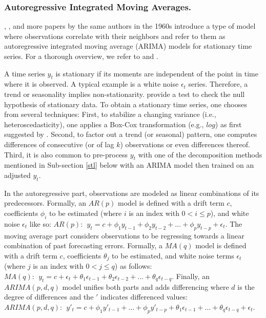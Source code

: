 \subsubsection{Autoregressive Integrated Moving Averages.}
\label{arima}

\cite{box1962}, \cite{box1968}, and more papers by the same authors in the
    1960s introduce a type of model where observations correlate with their
    neighbors and refer to them as autoregressive integrated moving average
    (ARIMA) models for stationary time series.
For a thorough overview, we refer to \cite{box2015} and \cite{brockwell2016}.

A time series $y_t$ is stationary if its moments are independent of the
    point in time where it is observed.
A typical example is a white noise $\epsilon_t$ series.
Therefore, a trend or seasonality implies non-stationarity.
\cite{kwiatkowski1992} provide a test to check the null hypothesis of
    stationary data.
To obtain a stationary time series, one chooses from several techniques:
First, to stabilize a changing variance (i.e., heteroscedasticity), one
    applies a Box-Cox transformation (e.g., $log$) as first suggested by
    \cite{box1964}.
Second, to factor out a trend (or seasonal) pattern, one computes differences
    of consecutive (or of lag $k$) observations or even differences thereof.
Third, it is also common to pre-process $y_t$ with one of the decomposition
    methods mentioned in Sub-section \ref{stl} below with an ARIMA model
    then trained on an adjusted $y_t$.

In the autoregressive part, observations are modeled as linear combinations of
    its predecessors.
Formally, an $AR(p)$ model is defined with a drift term $c$, coefficients
    $\phi_i$ to be estimated (where $i$ is an index with $0 < i \leq p$), and
    white noise $\epsilon_t$ like so:
$
AR(p): \ \
y_t = c + \phi_1 y_{t-1} + \phi_2 y_{t-2} + \dots + \phi_p y_{t-p}
      + \epsilon_t
$.
The moving average part considers observations to be regressing towards a
    linear combination of past forecasting errors.
Formally, a $MA(q)$ model is defined with a drift term $c$, coefficients
    $\theta_j$ to be estimated, and white noise terms $\epsilon_t$ (where $j$
    is an index with $0 < j \leq q$) as follows:
$
MA(q): \ \
y_t = c + \epsilon_t + \theta_1 \epsilon_{t-1} + \theta_2 \epsilon_{t-2}
      + \dots + \theta_q \epsilon_{t-q}
$.
Finally, an $ARIMA(p,d,q)$ model unifies both parts and adds differencing
    where $d$ is the degree of differences and the $'$ indicates differenced
    values:
$
ARIMA(p,d,q): \ \
y'_t = c + \phi_1 y'_{t-1} + \dots + \phi_p y'_{t-p} + \theta_1 \epsilon_{t-1}
       + \dots + \theta_q \epsilon_{t-q} + \epsilon_{t}
$.

